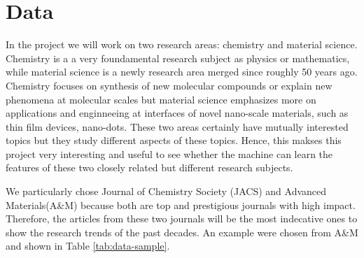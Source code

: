 \documentclass[conference]{IEEEtran}
\begin{document}


\section{Data}
In the project we will work on two research areas: chemistry and material science. Chemistry is a a very foundamental research subject as physics or mathematics, while material science is a newly research area merged since roughly 50 years ago. Chemistry focuses on synthesis of new molecular compounds or explain new phenomena at molecular scales but material science emphasizes more on applications and enginneeing at interfaces of novel nano-scale materials, such as thin film devices, nano-dots. These two areas certainly have mutually interested topics but they study different aspects of these topics. Hence, this makses this project very interesting and useful to see whether the machine can learn the features of these two closely related but different research subjects.

We particularly chose Journal of Chemistry Society (JACS) and Advanced Materials(A\&M) because both are top and prestigious journals with high impact. Therefore, the articles from these two journals will be the most indecative ones to show the research trends of the past decades. An example were chosen from A\&M and shown in Table \ref{tab:data-sample}.
\end{document}
